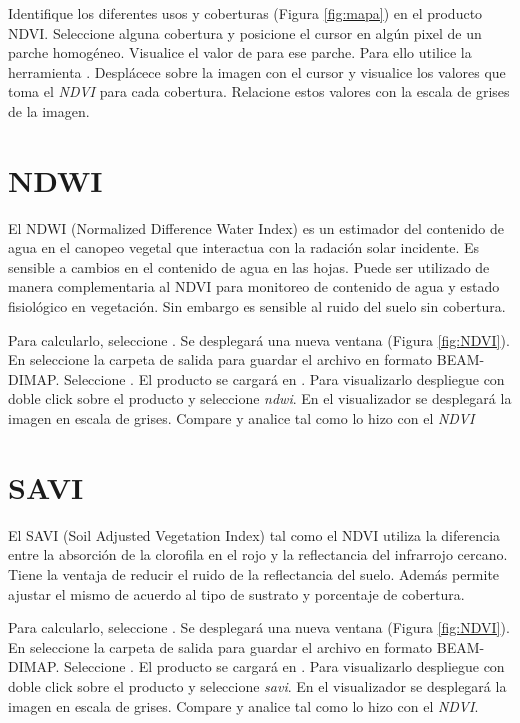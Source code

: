Identifique los diferentes usos y coberturas (Figura \ref{fig:mapa}) en el producto NDVI. Seleccione alguna cobertura y posicione el cursor en algún pixel de un parche homogéneo. Visualice el valor de  para ese parche. Para ello utilice la herramienta  . Desplácece sobre la imagen con el cursor y visualice  los valores que toma el \emph{NDVI} para cada cobertura. Relacione estos valores con la escala de grises de la imagen.


\section{NDWI}

El NDWI (Normalized Difference Water Index) es un estimador del contenido de agua en el canopeo vegetal que interactua con la radación solar incidente. Es sensible a cambios en el contenido de agua en las hojas. Puede ser utilizado de manera complementaria al NDVI para monitoreo de contenido de agua y estado fisiológico en vegetación. Sin embargo es sensible al ruido del suelo sin cobertura.

Para calcularlo, seleccione .  Se desplegará una nueva ventana (Figura \ref{fig:NDVI}). En  seleccione la carpeta de salida para guardar el archivo en formato BEAM-DIMAP. Seleccione . El producto  se cargará en . Para visualizarlo despliegue con doble click sobre el producto  y seleccione \emph {ndwi}. En el visualizador se desplegará la imagen en escala de grises. Compare y analice tal como lo hizo con el \emph{NDVI}

\section{SAVI}

El SAVI (Soil Adjusted Vegetation Index)  tal como el NDVI utiliza la diferencia entre la absorción de la clorofila en el rojo y la reflectancia del infrarrojo cercano. Tiene la ventaja de reducir el ruido de la reflectancia del suelo. Además permite ajustar el mismo de acuerdo al tipo de sustrato y porcentaje de cobertura. %

Para calcularlo, seleccione .  Se desplegará una nueva ventana (Figura \ref{fig:NDVI}). En  seleccione la carpeta de salida para guardar el archivo en formato BEAM-DIMAP. Seleccione . El producto  se cargará en . Para visualizarlo despliegue con doble click sobre el producto  y seleccione \emph {savi}. En el visualizador se desplegará la imagen en escala de grises. Compare y analice tal como lo hizo con el \emph{NDVI}.


